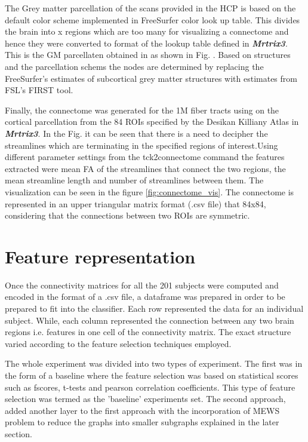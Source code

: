 \documentclass[msthesis.tex]{subfiles}
\begin{document}
The  Grey matter parcellation of the scans provided in the HCP is based on the default color scheme implemented in FreeSurfer color look up table. This divides the brain into x regions which are too many for visualizing a connectome and hence they were converted to format of the lookup table defined in \textit{\textbf{Mrtrix3}}.  This is the GM parcellaten obtained in as shown in Fig. . Based on structures and the parcellation schems the nodes are determined by replacing the FreeSurfer's estimates of subcortical grey matter structures with estimates from FSL's FIRST tool.


Finally, the connectome was generated for the 1M fiber tracts using on the cortical parcellation from the 84 ROIs specified by the Desikan Killiany Atlas in \textit{\textbf{Mrtrix3}}.  In the Fig. it can be seen that there is a need to decipher the streamlines which are terminating in the specified regions of interest.Using different parameter settings from the tck2connectome command the features extracted were mean FA of the streamlines that connect the two regions, the mean streamline length and number of streamlines between them. The visualization can be seen in the figure \ref{fig:connectome_vis}. The connectome is represented in an upper triangular matrix format (.csv file) that 84x84, considering that the connections between two ROIs are symmetric. 

\section{Feature representation}
Once the connectivity matrices for all the 201 subjects were computed and encoded in the format of a .csv file, a dataframe was prepared in order to be prepared to fit into the classifier. Each row represented the data for an individual subject. While, each column represented the connection between any two brain regions i.e. features in one cell of the connectivity matrix. The exact structure varied according to the feature selection techniques employed.

The whole experiment was divided into two types of experiment. The first was in the form of a baseline where the feature selection was based on statistical scores such as fscores, t-tests and pearson correlation coefficients. This type of feature selection was termed as the 'baseline' experiments set. The second approach, added another layer to the first approach with the incorporation of MEWS problem to reduce the graphs into smaller subgraphs explained in the later section.
\end{document}
